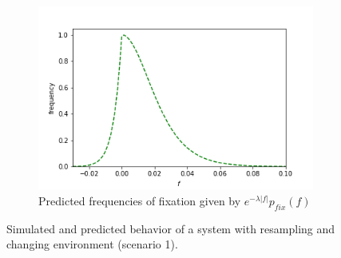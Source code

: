 \documentclass{article}
\begin{document}
\begin{figure}[h]
	\begin{subfigure}[t]{0.305\linewidth}
		\centering
		\includegraphics[width = 1.0\linewidth, trim={5 5 40 30}, clip=true]{figures/no_n_combined_dists.png}
		\caption{Predicted frequencies of fixation given by $e^{-\lambda |f|} p_{fix}(f)$}
		\label{fig:changing_resample_predict}
	\end{subfigure}
\caption{Simulated and predicted behavior of a system with resampling and changing environment (scenario 1).}
\label{fig:changing_resample}
\end{figure}
\end{document}

